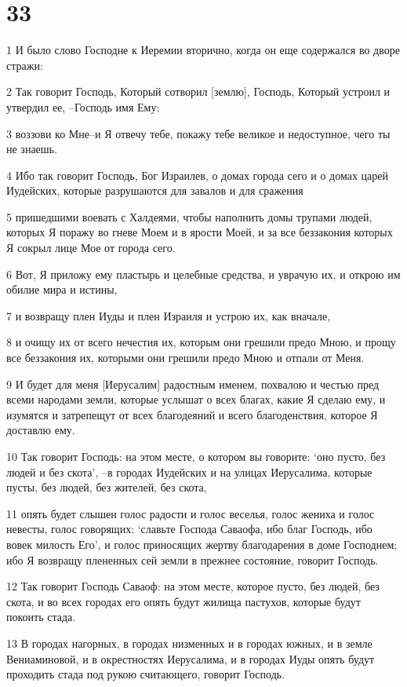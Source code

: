\chapter{33}

\par 1 И было слово Господне к Иеремии вторично, когда он еще содержался во дворе стражи:
\par 2 Так говорит Господь, Который сотворил [землю], Господь, Который устроил и утвердил ее, --Господь имя Ему:
\par 3 воззови ко Мне--и Я отвечу тебе, покажу тебе великое и недоступное, чего ты не знаешь.
\par 4 Ибо так говорит Господь, Бог Израилев, о домах города сего и о домах царей Иудейских, которые разрушаются для завалов и для сражения
\par 5 пришедшими воевать с Халдеями, чтобы наполнить домы трупами людей, которых Я поражу во гневе Моем и в ярости Моей, и за все беззакония которых Я сокрыл лице Мое от города сего.
\par 6 Вот, Я приложу ему пластырь и целебные средства, и уврачую их, и открою им обилие мира и истины,
\par 7 и возвращу плен Иуды и плен Израиля и устрою их, как вначале,
\par 8 и очищу их от всего нечестия их, которым они грешили предо Мною, и прощу все беззакония их, которыми они грешили предо Мною и отпали от Меня.
\par 9 И будет для меня [Иерусалим] радостным именем, похвалою и честью пред всеми народами земли, которые услышат о всех благах, какие Я сделаю ему, и изумятся и затрепещут от всех благодеяний и всего благоденствия, которое Я доставлю ему.
\par 10 Так говорит Господь: на этом месте, о котором вы говорите: `оно пусто, без людей и без скота', --в городах Иудейских и на улицах Иерусалима, которые пусты, без людей, без жителей, без скота,
\par 11 опять будет слышен голос радости и голос веселья, голос жениха и голос невесты, голос говорящих: `славьте Господа Саваофа, ибо благ Господь, ибо вовек милость Его', и голос приносящих жертву благодарения в доме Господнем; ибо Я возвращу плененных сей земли в прежнее состояние, говорит Господь.
\par 12 Так говорит Господь Саваоф: на этом месте, которое пусто, без людей, без скота, и во всех городах его опять будут жилища пастухов, которые будут покоить стада.
\par 13 В городах нагорных, в городах низменных и в городах южных, и в земле Вениаминовой, и в окрестностях Иерусалима, и в городах Иуды опять будут проходить стада под рукою считающего, говорит Господь.
